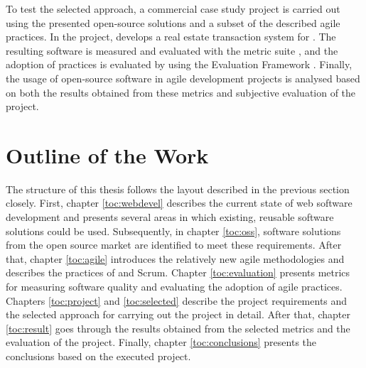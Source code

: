 To test the selected approach, a commercial case study project is 
carried out using the presented open-source solutions and a subset of 
the described agile practices. In the project,  develops a real estate transaction system for . The resulting software is measured and evaluated with the 
 metric suite \citep{oodmetrics}, and the adoption of 
 practices is evaluated by using the  Evaluation 
Framework \citep{xpevaluationfw}. Finally, the usage of open-source 
software in agile development projects is analysed based on both the 
results obtained from these metrics and subjective evaluation of the 
project.


\section{Outline of the Work}
\label{toc:intro:outline}

The structure of this thesis follows the layout described in the 
previous section closely. First, chapter \ref{toc:webdevel} describes 
the current state of web software development and presents several 
areas in which existing, reusable software solutions could be used. 
Subsequently, in chapter \ref{toc:oss}, software solutions from the 
open source market are identified to meet these requirements. After 
that, chapter \ref{toc:agile} introduces the relatively new agile 
methodologies and describes the practices of  and Scrum. 
Chapter \ref{toc:evaluation} presents metrics for measuring software 
quality and evaluating the adoption of agile practices. Chapters 
\ref{toc:project} and \ref{toc:selected} describe the project 
requirements and the selected approach for carrying out the project in 
detail. After that, chapter \ref{toc:result} goes through the results 
obtained from the selected metrics and the evaluation of the project. 
Finally, chapter \ref{toc:conclusions} presents the conclusions based 
on the executed project.

